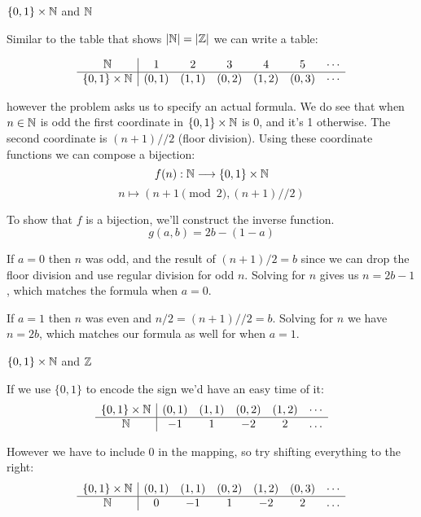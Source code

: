 \documentclass{article}
\begin{document}
\begin{problem}
$\{0, 1\} \times \mathbb{N}$ and $\mathbb{N}$
\end{problem}

Similar to the table that shows $|\mathbb{N}| = |\mathbb{Z}|$ we can write a table:

$$
  \begin{array}{c|cccccc}
    \mathbb{N}                 & 1      & 2      & 3      & 4      & 5      & \cdots \\
    \hline
    \{0, 1\} \times \mathbb{N} & (0, 1) & (1, 1) & (0, 2) & (1, 2) & (0, 3) & \cdots \\
  \end{array}
$$

however the problem asks us to specify an actual formula. We do see that when $n \in \mathbb{N}$ is odd the first coordinate in $\{0, 1\} \times \mathbb{N}$ is 0, and it's 1 otherwise. The second coordinate is $(n + 1) // 2$ (floor division). Using these coordinate functions we can compose a bijection:
$$f(n): \mathbb{N} \longrightarrow \{0, 1\} \times \mathbb{N}$$
$$n \longmapsto (n + 1 \pmod{2}, (n + 1) // 2)$$

To show that $f$ is a bijection, we'll construct the inverse function.
$$g(a, b) = 2b - (1 - a)$$

If $a = 0$ then $n$ was odd, and the result of $(n + 1) / 2 = b$ since we can drop the floor division and use regular division for odd $n$. Solving for $n$ gives us $n = 2b - 1$, which matches the formula when $a = 0$.

If $a = 1$ then $n$ was even and $n / 2 = (n + 1) // 2 = b$. Solving for $n$ we have $n = 2b$, which matches our formula as well for when $a = 1$.

\begin{problem}
$\{0, 1\} \times \mathbb{N}$ and $\mathbb{Z}$
\end{problem}

If we use $\{0, 1\}$ to encode the sign we'd have an easy time of it:
$$
  \begin{array}{c|cccccc}
    \{0, 1\} \times \mathbb{N} & (0, 1) & (1, 1) & (0, 2) & (1, 2) & \cdots \\
    \hline
    \mathbb{N}                 & -1     & 1      & -2     & 2      & \ldots
  \end{array}
$$

However we have to include 0 in the mapping, so try shifting everything to the right:
$$
  \begin{array}{c|ccccccc}
    \{0, 1\} \times \mathbb{N} & (0, 1) & (1, 1) & (0, 2) & (1, 2) & (0, 3) & \cdots \\
    \hline
    \mathbb{N}                 & 0      & -1     & 1      & -2     & 2      & \ldots
  \end{array}
$$
\end{document}
